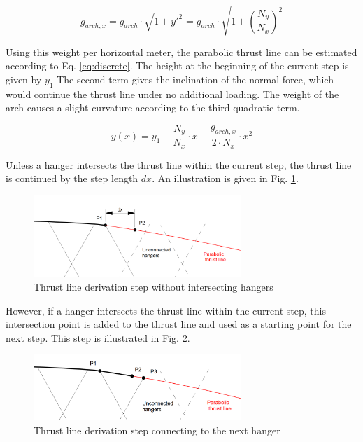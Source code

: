 \begin{equation}
    g_{arch,x} = g_{arch} \cdot \sqrt{1+y'^2} = g_{arch} \cdot \sqrt{1+\left( \frac{N_{y}}{N_{x}} \right)^2}
    \label{eq:g_arch}
\end{equation}

Using this weight per horizontal meter, the parabolic thrust line can be estimated according to Eq. \ref{eq:discrete}. The height at the beginning of the current step is given by $y_1$ The second term gives the inclination of the normal force, which would continue the thrust line under no additional loading. The weight of the arch causes a slight curvature according to the third quadratic term.

\begin{equation}
    y(x) = y_1 - \frac{N_y}{N_x} \cdot x - \frac{g_{arch,x}}{2\cdot N_x}\cdot x^2
    \label{eq:discrete}
\end{equation}

Unless a hanger intersects the thrust line within the current step, the thrust line is continued by the step length $dx$. An illustration is given in Fig. \ref{fig:discrete_1}.

\begin{figure}[H]
    \centering
    \includegraphics[width=0.7\textwidth]{overleaf/Appendix/Pictures/discrete_thrust_line_1.PNG}
    \caption{Thrust line derivation step without intersecting hangers}
    \label{fig:discrete_1}
\end{figure}

However, if a hanger intersects the thrust line within the current step, this intersection point is added to the thrust line and used as a starting point for the next step. This step is illustrated in Fig. \ref{fig:discrete_2}.

\begin{figure}[H]
    \centering
    \includegraphics[width=0.7\textwidth]{overleaf/Appendix/Pictures/discrete_thrust_line_2.PNG}
    \caption{Thrust line derivation step connecting to the next hanger}
    \label{fig:discrete_2}
\end{figure}

